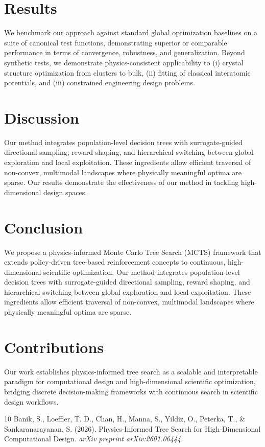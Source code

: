 \documentclass{article}
\begin{document}
\section{Results}
We benchmark our approach against standard global optimization baselines on a suite of canonical test functions, demonstrating superior or comparable performance in terms of convergence, robustness, and generalization. Beyond synthetic tests, we demonstrate physics-consistent applicability to (i) crystal structure optimization from clusters to bulk, (ii) fitting of classical interatomic potentials, and (iii) constrained engineering design problems.

\section{Discussion}
Our method integrates population-level decision trees with surrogate-guided directional sampling, reward shaping, and hierarchical switching between global exploration and local exploitation. These ingredients allow efficient traversal of non-convex, multimodal landscapes where physically meaningful optima are sparse. Our results demonstrate the effectiveness of our method in tackling high-dimensional design spaces.

\section{Conclusion}
We propose a physics-informed Monte Carlo Tree Search (MCTS) framework that extends policy-driven tree-based reinforcement concepts to continuous, high-dimensional scientific optimization. Our method integrates population-level decision trees with surrogate-guided directional sampling, reward shaping, and hierarchical switching between global exploration and local exploitation. These ingredients allow efficient traversal of non-convex, multimodal landscapes where physically meaningful optima are sparse.

\section{Contributions}
Our work establishes physics-informed tree search as a scalable and interpretable paradigm for computational design and high-dimensional scientific optimization, bridging discrete decision-making frameworks with continuous search in scientific design workflows.

\begin{thebibliography}{10}
Banik, S., Loeffler, T. D., Chan, H., Manna, S., Yildiz, O., Peterka, T., & Sankaranarayanan, S. (2026). Physics-Informed Tree Search for High-Dimensional Computational Design. \emph{arXiv preprint arXiv:2601.06444}.
\end{thebibliography}
\end{document}
